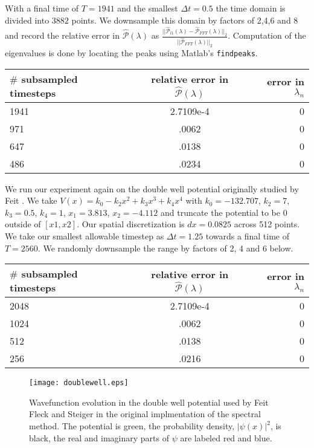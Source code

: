 \documentclass[11pt]{amsart}
\theoremstyle{remark}
\begin{document}
With a final time of $T=1941$ and the smallest $\Delta t = 0.5$ the time domain is divided into $3882$ points. We downsample this domain by factors of 2,4,6 and 8 and record the relative error in  $\hat{\mathcal{P}}(\lambda)$ as $\frac{||\hat{\mathcal{P}}_{l1}(\lambda) - \hat{\mathcal{P}}_{FFT}(\lambda)||_2}{||\hat{\mathcal{P}}_{FFT}(\lambda)||_2}$. Computation of the eigenvalues is done by locating the peaks using Matlab's \texttt{findpeaks}.

\begin{center}
\begin{tabular}{ l |c| r  }
  \hline                       
  $\#$ subsampled timesteps & relative error in $\hat{\mathcal{P}}(\lambda)$ & error in $\lambda_n$\\ \hline
   1941 & 2.7109e-4 & 0\\
   971 & .0062 & 0\\
   647 & .0138 & 0\\
   486 &  .0234 & 0\\
  \hline  
\end{tabular}
\end{center}

We run our experiment again on the double well potential originally studied by Feit \cite{FEIT1982}. We take $V(x) = k_0 - k_2x^2 + k_3x^3 + k_4x^4$ with $k_0=-132.707$, $k_2=7$, $k_3=0.5$, $k_4=1$, $x_1=3.813$, $x_2=-4.112$ and truncate the potential to be 0 outside of $[x1,x2]$. Our spatial discretization is $dx=0.0825$ across 512 points. We take our smallest allowable timestep as $\Delta t=1.25$ towards a final time of $T=2560$. We randomly downsample the range by factors of 2, 4 and 6 below.

\begin{center}
\begin{tabular}{ l | c | r  }
  \hline                       
  $\#$ subsampled timesteps & relative error in $\hat{\mathcal{P}}(\lambda)$ & error in $\lambda_n$\\ \hline
   2048 & 2.7109e-4 & 0\\
   1024 & .0062 & 0\\
   512 & .0138 & 0\\
   256 & .0216 & 0\\
  \hline  
\end{tabular}
\end{center}

\begin{center}
\begin{figure}
\texttt{[image: doublewell.eps]}
\caption{Wavefunction evolution in the double well potential used by Feit Fleck and Steiger in the original implmentation of the spectral method. The potential is green, the probability density, $|\psi(x)|^2$, is black, the real and imaginary parts of $\psi$ are labeled red and blue.}
\end{figure}
\end{center}
\end{document}
